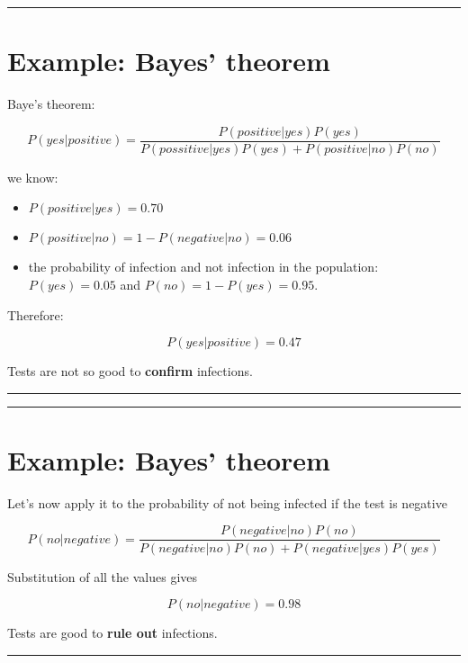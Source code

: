 \documentclass[
]{book}
\begin{document}
\begin{center}\rule{0.5\linewidth}{0.5pt}\end{center}

\hypertarget{example-bayes-theorem}{%
\section{Example: Bayes' theorem}\label{example-bayes-theorem}}

Baye's theorem:

\[P(yes|positive)  = \frac{P(positive|yes) P(yes)}{P(possitive|yes)P(yes)+P(positive|no)P(no)}\]

we know:

\begin{itemize}
\item
  \(P(positive|yes)=0.70\)
\item
  \(P(positive|no)=1- P(negative|no)=0.06\)
\item
  the probability of infection and not infection in the population: \(P(yes)=0.05\) and \(P(no)=1-P(yes)=0.95\).
\end{itemize}

Therefore:

\[P(yes|positive)=0.47\]

Tests are not so good to \textbf{confirm} infections.

\begin{center}\rule{0.5\linewidth}{0.5pt}\end{center}

\begin{center}\rule{0.5\linewidth}{0.5pt}\end{center}

\hypertarget{example-bayes-theorem-1}{%
\section{Example: Bayes' theorem}\label{example-bayes-theorem-1}}

Let's now apply it to the probability of not being infected if the test is negative

\[P(no|negative)  = \frac{P(negative|no)  P(no)}{P(negative|no) P(no)+P(negative|yes)P(yes)}\]

Substitution of all the values gives

\[P(no|negative)=0.98\]

Tests are good to \textbf{rule out} infections.

\begin{center}\rule{0.5\linewidth}{0.5pt}\end{center}
\end{document}
